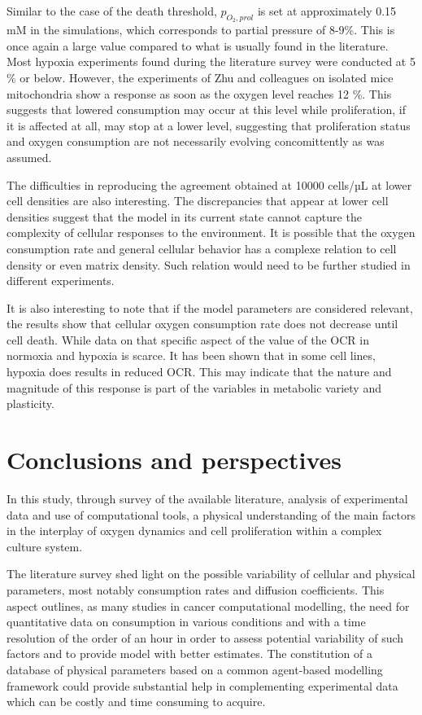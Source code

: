 \documentclass[11pt,a4paper]{article}
\begin{document}
Similar to the case of the death threshold, $p_{O_2,prol}$ is set at approximately 0.15 mM in the simulations, which corresponds to  partial pressure of 8-9\%. This is once again a large value compared to what is usually found in the literature. Most hypoxia experiments found during the literature survey were conducted at 5 \% or below.\cite{Chen2015}\cite{Cunha2019}\cite{Liu2022}\cite{Nisar2023} However, the experiments of Zhu and colleagues on isolated mice mitochondria show a response as soon as the oxygen level reaches 12 \%.\cite{Zhu2020} This suggests that lowered consumption may occur at this level while proliferation, if it is affected at all, may stop at a lower level, suggesting that proliferation status and oxygen consumption are not necessarily evolving concomittently as was assumed.

The difficulties in reproducing the agreement obtained at 10000 cells/µL at lower cell densities are also interesting. The discrepancies that appear at lower cell densities suggest that the model in its current state cannot capture the complexity of cellular responses to the environment. It is possible that the oxygen consumption rate and general cellular behavior has a complexe relation to cell density or even matrix density. Such relation would need to be further studied in different experiments. 

It is also interesting to note that if the model parameters are considered relevant, the results show that cellular oxygen consumption rate does not decrease until cell death.    While data on that specific aspect of the value of the OCR in normoxia and hypoxia is scarce. It has been shown that in some cell lines, hypoxia does results in reduced OCR.\cite{Papandreou2006} This may indicate that the nature and magnitude of this response is part of the variables in metabolic variety and plasticity.

\section{Conclusions and perspectives}
In this study, through survey of the available literature, analysis of experimental data and use of computational tools, a physical understanding of the main factors in the interplay of oxygen dynamics and cell proliferation within a complex culture system.

The literature survey shed light on the possible variability of cellular and physical parameters, most notably consumption rates and diffusion coefficients. This aspect outlines, as many studies in cancer computational modelling, the need for quantitative data on consumption in various conditions and with a time resolution of the order of an hour in order to assess potential variability of such factors and to provide model with better estimates. The constitution of a database of physical parameters based on a common agent-based modelling framework could provide substantial help in complementing experimental data which can be costly and time consuming to acquire.
\end{document}
